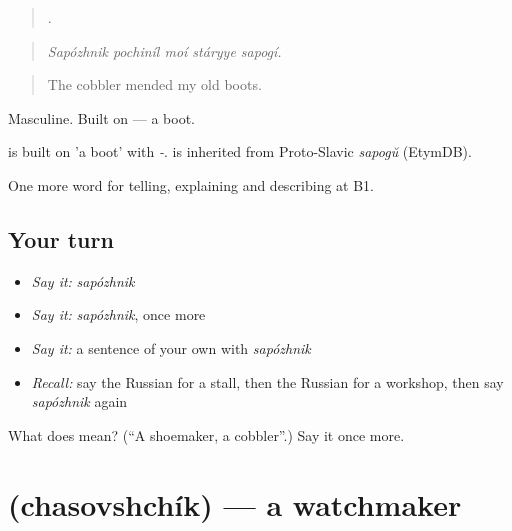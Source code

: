 \begin{quote}
    .
\end{quote}

\begin{quote}
\emph{Sapózhnik pochiníl moí stáryye sapogí.}
\end{quote}

\begin{quote}
The cobbler mended my old boots.
\end{quote}

Masculine. Built on \emph{} — a boot.

\begin{cousinweb}
\emph{} is built on \emph{} 'a boot' with \emph{-}. \emph{} is inherited from Proto-Slavic \emph{sapogŭ} (EtymDB).
\end{cousinweb}

\begin{grammarlens}[title={What you've built}]
One more word for telling, explaining and describing at B1.
\end{grammarlens}

\subsection*{Your turn}
\begin{itemize}
\raggedright
  \item \emph{Say it:} \emph{sapózhnik}
  \item \emph{Say it:} \emph{sapózhnik}, once more
  \item \emph{Say it:} a sentence of your own with \emph{sapózhnik}
  \item \emph{Recall:} say the Russian for a stall, then the Russian for a workshop, then say \emph{sapózhnik} again
\end{itemize}

\begin{tcolorbox}[breakable,colback=teal!4,colframe=teal!35!black,title={Before you move on}]
What does  mean? (\textquotedblleft{}A shoemaker, a cobbler\textquotedblright{}.) Say it once more.
\end{tcolorbox}
\section[\texorpdfstring{\ru{часовщик} (chasovshchík)}{часовщик (chasovshchík)}]{ (chasovshchík) — a watchmaker}

